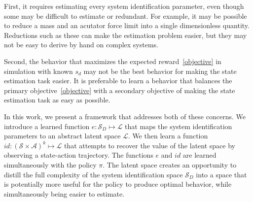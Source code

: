 \documentclass{article}
\newcommand{\cA}{\mathcal{A}}
\newcommand{\cL}{\mathcal{L}}
\newcommand{\cS}{\mathcal{S}}
\begin{document}
First, it requires estimating every system identification parameter,
even though some may be difficult to estimate or redundant.
For example, it may be possible to reduce a mass and an acutator force limit into a single dimensionless quantity.
Reductions such as these can make the estimation problem easier, but they may not be easy to derive by hand on complex systems.

Second, the behavior that maximizes the expected reward~\eqref{objective}
in simulation with known $s_d$ may not be the best behavior for making the state estimation task easier.
It is preferable to learn a behavior that balances the primary objective~\eqref{objective}
with a secondary objective of making the state estimation task as easy as possible.

In this work, we present a framework that addresses both of these concerns.
We introduce a learned function $e : \cS_D \mapsto \cL$
that maps the system identification parameters to an abstract latent space $\cL$.
We then learn a function $id : (\cS \times \cA)^k \mapsto \cL$
that attempts to recover the value of the latent space by observing a state-action trajectory.
The functions $e$ and $id$ are learned simultaneously with the policy $\pi$.
The latent space creates an opportunity to distill the full complexity of the system identification space $\cS_D$ into a space that is potentially more useful for the policy to produce optimal behavior,
while simultaneously being easier to estimate.
\end{document}
